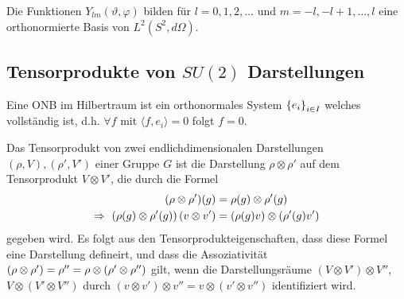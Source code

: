 \begin{satz}
    Die Funktionen $Y_{lm} (\vartheta,\varphi)$ bilden für $l=0,1,2,\dots$
    und $m = -l,-l+1,\dots,l$ eine orthonormierte Basis von $L^2 (S^2,d \Omega)$.
\end{satz}

\subsection{Tensorprodukte von $SU(2)$ Darstellungen}

\begin{definition}
    Eine ONB im Hilbertraum ist ein orthonormales System $\left\{ e_i \right\}_{i \in I}$
    welches vollständig ist, d.h. $\forall f$ mit $\langle f, e_i \rangle = 0$
    folgt $f=0$.
\end{definition}

\begin{definition}[Tensorprodukt]
    Das Tensorprodukt von zwei endlichdimensionalen Darstellungen $(\rho,V),
    (\rho',V')$ einer Gruppe $G$ ist die Darstellung $\rho \otimes \rho'$
    auf dem Tensorprodukt $V \otimes V'$, die durch die Formel
    \begin{align*}
        (\rho \otimes \rho')(g) &= \rho(g) \otimes \rho'(g)
        \\ \Rightarrow \
        \left( \rho(g) \otimes \rho'(g) \right)(v \otimes v')
        &= \left( \rho(g)v \right) \otimes \left( \rho'(g) v' \right)
    \end{align*}
    gegeben wird. Es folgt aus den Tensorprodukteigenschaften, dass diese Formel
    eine Darstellung defineirt, und dass die Assoziativität $(\rho \otimes \rho')
    = \rho'' = \rho \otimes \left( \rho' \otimes \rho'' \right)$ gilt, wenn die
    Darstellungsräume $(V \otimes V') \otimes V''$, $V \otimes (V' \otimes V'')$
    durch $(v \otimes v') \otimes v'' = v \otimes (v' \otimes v'')$ identifiziert
    wird.
\end{definition}



